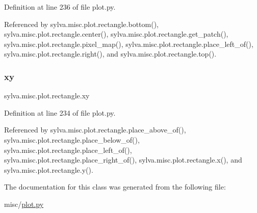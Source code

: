 Definition at line 236 of file plot.\+py.



Referenced by sylva.\+misc.\+plot.\+rectangle.\+bottom(), sylva.\+misc.\+plot.\+rectangle.\+center(), sylva.\+misc.\+plot.\+rectangle.\+get\+\_\+patch(), sylva.\+misc.\+plot.\+rectangle.\+pixel\+\_\+map(), sylva.\+misc.\+plot.\+rectangle.\+place\+\_\+left\+\_\+of(), sylva.\+misc.\+plot.\+rectangle.\+right(), and sylva.\+misc.\+plot.\+rectangle.\+top().

\mbox{\label{classsylva_1_1misc_1_1plot_1_1rectangle_a1bf48f6505e5a549e1056f6a8cb0b454}} 
\subsubsection{\texorpdfstring{xy}{xy}}
{\footnotesize\ttfamily sylva.\+misc.\+plot.\+rectangle.\+xy}



Definition at line 234 of file plot.\+py.



Referenced by sylva.\+misc.\+plot.\+rectangle.\+place\+\_\+above\+\_\+of(), sylva.\+misc.\+plot.\+rectangle.\+place\+\_\+below\+\_\+of(), sylva.\+misc.\+plot.\+rectangle.\+place\+\_\+left\+\_\+of(), sylva.\+misc.\+plot.\+rectangle.\+place\+\_\+right\+\_\+of(), sylva.\+misc.\+plot.\+rectangle.\+x(), and sylva.\+misc.\+plot.\+rectangle.\+y().



The documentation for this class was generated from the following file\+:\begin{DoxyCompactItemize}
\item 
misc/\hyperlink{plot_8py}{plot.\+py}\end{DoxyCompactItemize}
